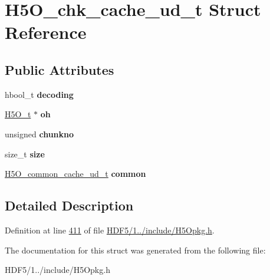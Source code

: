 \hypertarget{struct_h5_o__chk__cache__ud__t}{}\section{H5\+O\+\_\+chk\+\_\+cache\+\_\+ud\+\_\+t Struct Reference}
\label{struct_h5_o__chk__cache__ud__t}
\subsection*{Public Attributes}
\begin{DoxyCompactItemize}
\item 
\mbox{\label{struct_h5_o__chk__cache__ud__t_adec55eccd8145b542732e13924eb5079}} 
hbool\+\_\+t {\bfseries decoding}
\item 
\mbox{\label{struct_h5_o__chk__cache__ud__t_a02b837ccfc6b51e2d7cd0285facd7235}} 
\hyperlink{struct_h5_o__t}{H5\+O\+\_\+t} $\ast$ {\bfseries oh}
\item 
\mbox{\label{struct_h5_o__chk__cache__ud__t_a0ed17113831c7f797d1b07a37307a7ed}} 
unsigned {\bfseries chunkno}
\item 
\mbox{\label{struct_h5_o__chk__cache__ud__t_ad8f61fcbbce7c10172996bd32e7f9f01}} 
size\+\_\+t {\bfseries size}
\item 
\mbox{\label{struct_h5_o__chk__cache__ud__t_ac772ef57018b81a4ee68b32d071b4342}} 
\hyperlink{struct_h5_o__common__cache__ud__t}{H5\+O\+\_\+common\+\_\+cache\+\_\+ud\+\_\+t} {\bfseries common}
\end{DoxyCompactItemize}


\subsection{Detailed Description}


Definition at line \hyperlink{_h_d_f5_21_810_81_2include_2_h5_opkg_8h_source_l00411}{411} of file \hyperlink{_h_d_f5_21_810_81_2include_2_h5_opkg_8h_source}{H\+D\+F5/1../include/\+H5\+Opkg.\+h}.



The documentation for this struct was generated from the following file\+:\begin{DoxyCompactItemize}
\item 
H\+D\+F5/1../include/\+H5\+Opkg.\+h\end{DoxyCompactItemize}
